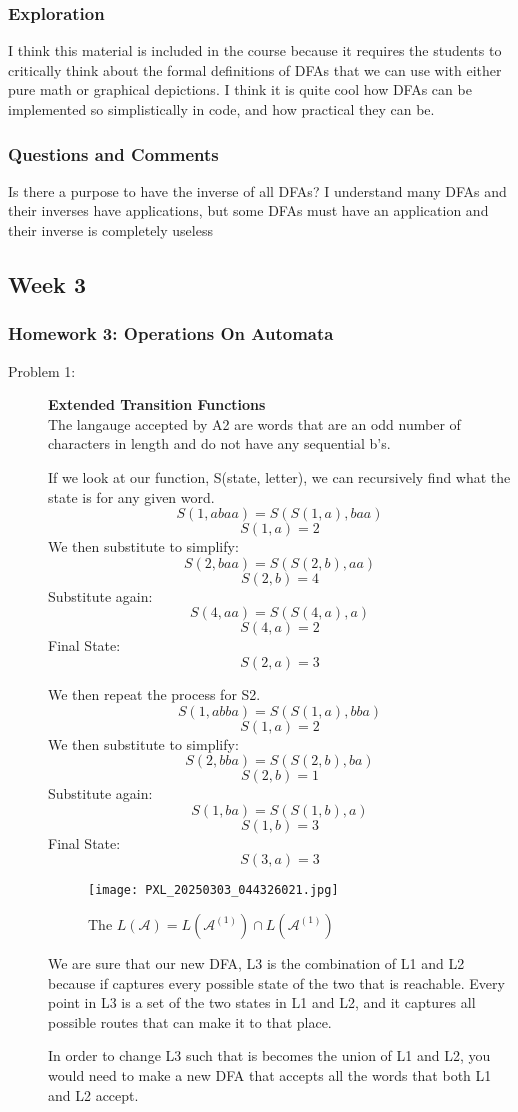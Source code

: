 \documentclass{article}
\theoremstyle{theorem}
\theoremstyle{definition}
\theoremstyle{remark}
\begin{document}
\subsubsection{Exploration}
I think this material is included in the course because it requires the students to critically think about the formal definitions of DFAs that we can use with either pure math or graphical depictions. I think it is quite cool how DFAs can be implemented so simplistically in code, and how practical they can be. 

\subsubsection{Questions and Comments}
Is there a purpose to have the inverse of all DFAs? I understand many DFAs and their inverses have applications, but some DFAs must have an application and their inverse is completely useless

\subsection{Week 3}
\subsubsection{Homework 3: Operations On Automata}
\begin{description}
\item[Problem 1: ] \textbf{Extended Transition Functions}\\
The langauge accepted by A2 are words that are an odd number of characters in length and do not have any sequential b's. 

If we look at our function, S(state, letter), we can recursively find what the state is for any given word.
$$ S(1, abaa) = S(S(1, a), baa)$$
$$S(1, a) = 2$$
We then substitute to simplify:
$$S(2, baa) = S(S(2, b), aa)$$
$$S(2,b) = 4$$
Substitute again:
$$S(4, aa) = S(S(4, a), a)$$
$$S(4, a) = 2$$
Final State:
$$S(2, a) = 3$$

We then repeat the process for S2.
$$ S(1, abba) = S(S(1, a), bba)$$
$$S(1, a) = 2$$
We then substitute to simplify:
$$S(2, bba) = S(S(2, b), ba)$$
$$S(2,b) = 1$$
Substitute again:
$$S(1, ba) = S(S(1, b), a)$$
$$S(1, b) = 3$$
Final State:
$$S(3, a) = 3$$

\begin{figure}
    \centering
    \texttt{[image: PXL\_20250303\_044326021.jpg]}
    \caption{The $L(\mathcal A) = L(\mathcal A^{(1)}) \cap L(\mathcal A^{(1)})$}
    \label{fig:enter-label}
\end{figure}

We are sure that our new DFA, L3 is the combination of L1 and L2 because if captures every possible state of the two that is reachable. Every point in L3 is a set of the two states in L1 and L2, and it captures all possible routes that can make it to that place.

In order to change L3 such that is becomes the union of L1 and L2, you would need to make a new DFA that accepts all the words that both L1 and L2 accept. 
\end{description}
\end{document}
